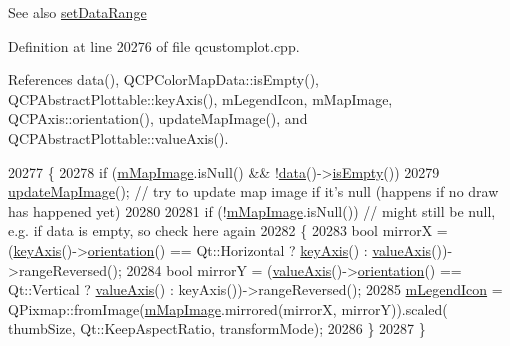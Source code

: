 \begin{DoxySeeAlso}{See also}
\hyperlink{class_q_c_p_color_map_a980b42837821159786a85b4b7dcb8774}{set\+Data\+Range} 
\end{DoxySeeAlso}


Definition at line 20276 of file qcustomplot.\+cpp.



References data(), Q\+C\+P\+Color\+Map\+Data\+::is\+Empty(), Q\+C\+P\+Abstract\+Plottable\+::key\+Axis(), m\+Legend\+Icon, m\+Map\+Image, Q\+C\+P\+Axis\+::orientation(), update\+Map\+Image(), and Q\+C\+P\+Abstract\+Plottable\+::value\+Axis().


\begin{DoxyCode}
20277 \{
20278   \textcolor{keywordflow}{if} (\hyperlink{class_q_c_p_color_map_a66110813b42eca78b64095b2a1f285a0}{mMapImage}.isNull() && !\hyperlink{class_q_c_p_color_map_a3ae12c9ce842352037cd20ea5267414f}{data}()->\hyperlink{class_q_c_p_color_map_data_a986009324aee1fc5f696db46bd03dde5}{isEmpty}())
20279     \hyperlink{class_q_c_p_color_map_a5efcea591bb5486d968af520a4d43c3a}{updateMapImage}(); \textcolor{comment}{// try to update map image if it's null (happens if no draw has
       happened yet)}
20280   
20281   \textcolor{keywordflow}{if} (!\hyperlink{class_q_c_p_color_map_a66110813b42eca78b64095b2a1f285a0}{mMapImage}.isNull()) \textcolor{comment}{// might still be null, e.g. if data is empty, so check here again}
20282   \{
20283     \textcolor{keywordtype}{bool} mirrorX = (\hyperlink{class_q_c_p_abstract_plottable_a72c7a09c22963f2c943f07112b311103}{keyAxis}()->\hyperlink{class_q_c_p_axis_a57483f2f60145ddc9e63f3af53959265}{orientation}() == Qt::Horizontal ? 
      \hyperlink{class_q_c_p_abstract_plottable_a72c7a09c22963f2c943f07112b311103}{keyAxis}() : \hyperlink{class_q_c_p_abstract_plottable_a3106f9d34d330a6097a8ec5905e5b519}{valueAxis}())->rangeReversed();
20284     \textcolor{keywordtype}{bool} mirrorY = (\hyperlink{class_q_c_p_abstract_plottable_a3106f9d34d330a6097a8ec5905e5b519}{valueAxis}()->\hyperlink{class_q_c_p_axis_a57483f2f60145ddc9e63f3af53959265}{orientation}() == Qt::Vertical ? 
      \hyperlink{class_q_c_p_abstract_plottable_a3106f9d34d330a6097a8ec5905e5b519}{valueAxis}() : keyAxis())->rangeReversed();
20285     \hyperlink{class_q_c_p_color_map_ada522988db02cb531767d38c5029ef60}{mLegendIcon} = QPixmap::fromImage(\hyperlink{class_q_c_p_color_map_a66110813b42eca78b64095b2a1f285a0}{mMapImage}.mirrored(mirrorX, mirrorY)).scaled(
      thumbSize, Qt::KeepAspectRatio, transformMode);
20286   \}
20287 \}
\end{DoxyCode}


